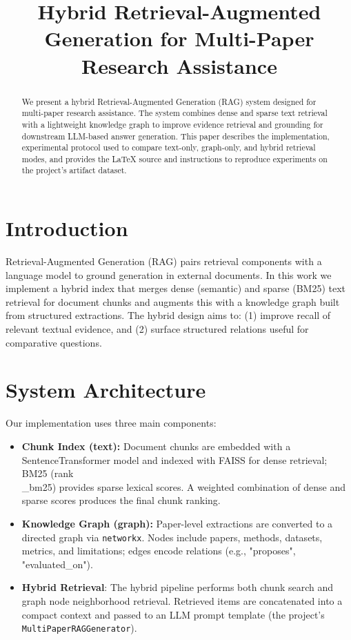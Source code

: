 \documentclass[conference]{IEEEtran}
\begin{document}
\title{Hybrid Retrieval-Augmented Generation for Multi-Paper Research Assistance}

\author{
}

\maketitle

\begin{abstract}
We present a hybrid Retrieval-Augmented Generation (RAG) system designed
for multi-paper research assistance. The system combines dense and sparse
text retrieval with a lightweight knowledge graph to improve evidence
retrieval and grounding for downstream LLM-based answer generation.
This paper describes the implementation, experimental protocol used to
compare text-only, graph-only, and hybrid retrieval modes, and provides
the LaTeX source and instructions to reproduce experiments on the
project's artifact dataset.
\end{abstract}

\section{Introduction}
Retrieval-Augmented Generation (RAG) pairs retrieval components with a
language model to ground generation in external documents. In this
work we implement a hybrid index that merges dense (semantic) and
sparse (BM25) text retrieval for document chunks and augments this with
a knowledge graph built from structured extractions. The hybrid design
aims to: (1) improve recall of relevant textual evidence, and (2)
surface structured relations useful for comparative questions.

\section{System Architecture}
Our implementation uses three main components:
\begin{itemize}
  \item \textbf{Chunk Index (text):} Document chunks are embedded with
    a SentenceTransformer model and indexed with FAISS for dense
    retrieval; BM25 (rank\\_bm25) provides sparse lexical scores. A
    weighted combination of dense and sparse scores produces the final
    chunk ranking.
  \item \textbf{Knowledge Graph (graph):} Paper-level extractions are
    converted to a directed graph via \texttt{networkx}. Nodes include
    papers, methods, datasets, metrics, and limitations; edges encode
    relations (e.g., "proposes", "evaluated\_on").
  \item \textbf{Hybrid Retrieval}: The hybrid pipeline performs both
    chunk search and graph node neighborhood retrieval. Retrieved
    items are concatenated into a compact context and passed to an
    LLM prompt template (the project's \texttt{MultiPaperRAGGenerator}).
\end{itemize}
\end{document}
